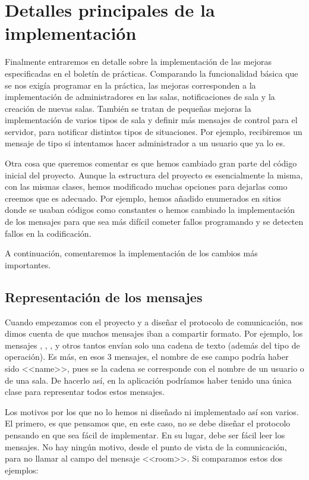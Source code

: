\section{Detalles principales de la implementación} 
Finalmente entraremos en detalle sobre la implementación  de las mejoras especificadas en el boletín de prácticas. Comparando la funcionalidad básica que se nos exigía programar en la práctica, las mejoras corresponden a la implementación de administradores en las salas, notificaciones de sala y la creación de nuevas salas. También se tratan de pequeñas mejoras la implementación de varios tipos de sala y definir más mensajes de control para el servidor, para notificar distintos tipos de situaciones. Por ejemplo, recibiremos un mensaje de tipo  si intentamos hacer administrador a un usuario que ya lo es.

Otra cosa que queremos comentar es que hemos cambiado gran parte del código inicial del proyecto. Aunque la estructura del proyecto es esencialmente la misma, con las mismas clases, hemos modificado muchas opciones para dejarlas como creemos que es adecuado. Por ejemplo, hemos añadido enumerados en sitios donde se usaban códigos como constantes o hemos cambiado la implementación de los mensajes para que sea más difícil cometer fallos programando y se detecten fallos en la codificación.

A continuación, comentaremos la implementación de los cambios más importantes.

\subsection{Representación de los mensajes} %
Cuando empezamos con el proyecto y a diseñar el protocolo de comunicación, nos dimos cuenta de que muchos mensajes iban a compartir formato. Por ejemplo, los mensajes , , , y otros tantos envían solo una cadena de texto (además del tipo de operación). Es más, en esos $3$ mensajes, el nombre de ese campo podría haber sido <<name>>, pues se la cadena se corresponde con el nombre de un usuario o de una sala. De hacerlo así, en la aplicación podríamos haber tenido una única clase para representar todos estos mensajes.

Los motivos por los que no lo hemos ni diseñado ni implementado así son varios. El primero, es que pensamos que, en este caso, no se debe diseñar el protocolo pensando en que sea fácil de implementar. En su lugar, debe ser fácil leer los mensajes. No hay ningún motivo, desde el punto de vista de la comunicación, para no llamar al campo del mensaje  <<room>>. Si comparamos estos dos ejemplos:

